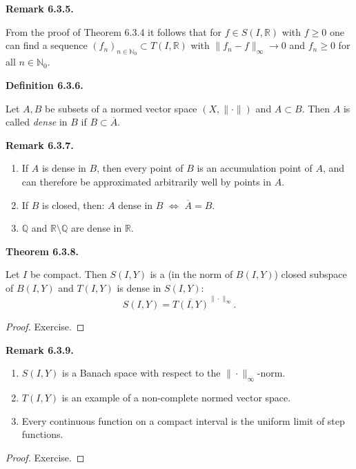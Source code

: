 \documentclass[12pt]{article}
\newenvironment{satz}[1]{%
  \par\vspace{6pt}\noindent\textbf{Theorem #1.}\itshape\space
}{%
  \par\vspace{6pt}
}
\newenvironment{definition}[1]{%
  \par\vspace{6pt}\noindent\textbf{Definition #1.}\itshape\space
}{%
  \par\vspace{6pt}
}
\newenvironment{bemerkung}[1]{%
  \par\vspace{6pt}\noindent\textbf{Remark #1.}\itshape\space
}{%
  \par\vspace{6pt}
}
\begin{document}
\begin{bemerkung}{6.3.5}
From the proof of Theorem 6.3.4 it follows that for $f\in S(I,\mathbb R)$ with
$f\ge 0$ one can find a sequence $(f_n)_{n\in\mathbb N_0}\subset T(I,\mathbb R)$ with
$\|f_n-f\|_\infty\to 0$ and $f_n\ge 0$ for all $n\in\mathbb N_0$.
\end{bemerkung}

\begin{definition}{6.3.6}
Let $A,B$ be subsets of a normed vector space $(X,\|\cdot\|)$ and $A\subset B$.
Then $A$ is called \emph{dense} in $B$ if $B\subset\overline{A}$.
\end{definition}

\begin{bemerkung}{6.3.7}
\begin{enumerate}
    \item If $A$ is dense in $B$, then every point of $B$ is an accumulation point of $A$,
    and can therefore be approximated arbitrarily well by points in $A$.

    \item If $B$ is closed, then: $A$ dense in $B$ $\iff$ $\overline{A}=B$.

    \item $\mathbb Q$ and $\mathbb R\setminus\mathbb Q$ are dense in $\mathbb R$.
\end{enumerate}
\end{bemerkung}

\begin{satz}{6.3.8}
Let $I$ be compact. Then $S(I,Y)$ is a (in the norm of $B(I,Y)$) closed
subspace of $B(I,Y)$ and $T(I,Y)$ is dense in $S(I,Y)$:
\[
S(I,Y)=\overline{T(I,Y)}^{\|\cdot\|_\infty}.
\]
\end{satz}

\begin{proof}
Exercise.
\end{proof}

\begin{bemerkung}{6.3.9}
\begin{enumerate}
    \item $S(I,Y)$ is a Banach space with respect to the $\|\cdot\|_\infty$-norm.

    \item $T(I,Y)$ is an example of a non-complete normed vector space.

    \item Every continuous function on a compact interval is the uniform limit of step functions.
\end{enumerate}
\end{bemerkung}

\begin{proof}
Exercise.
\end{proof}
\end{document}
